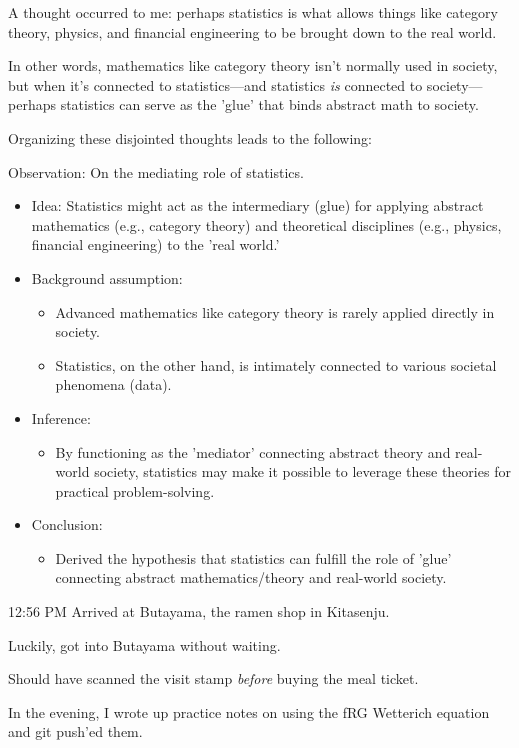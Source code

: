 \documentclass{article}
\begin{document}
A thought occurred to me: perhaps statistics is what allows things like category theory, physics, and financial engineering to be brought down to the real world.

In other words, mathematics like category theory isn't normally used in society, but when it's connected to statistics---and statistics \textit{is} connected to society---perhaps statistics can serve as the 'glue' that binds abstract math to society.

Organizing these disjointed thoughts leads to the following:

Observation: On the mediating role of statistics.
\begin{itemize}
    \item Idea: Statistics might act as the intermediary (glue) for applying abstract mathematics (e.g., category theory) and theoretical disciplines (e.g., physics, financial engineering) to the 'real world.'
    \item Background assumption:
    \begin{itemize}
        \item Advanced mathematics like category theory is rarely applied directly in society.
        \item Statistics, on the other hand, is intimately connected to various societal phenomena (data).
    \end{itemize}
    \item Inference:
    \begin{itemize}
        \item By functioning as the 'mediator' connecting abstract theory and real-world society, statistics may make it possible to leverage these theories for practical problem-solving.
    \end{itemize}
    \item Conclusion:
    \begin{itemize}
        \item Derived the hypothesis that statistics can fulfill the role of 'glue' connecting abstract mathematics/theory and real-world society.
    \end{itemize}
\end{itemize}

12:56 PM
Arrived at Butayama, the ramen shop in Kitasenju.

Luckily, got into Butayama without waiting.

Should have scanned the visit stamp \textit{before} buying the meal ticket.

In the evening, I wrote up practice notes on using the fRG Wetterich equation and git push'ed them.
\end{document}
